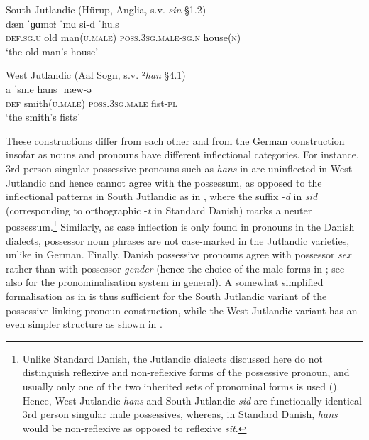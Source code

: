 \documentclass[output=paper]{langsci/langscibook}
\begin{document}
 
\ea\label{ex:hoeder:17}
	\ea\label{ex:hoeder:17a}
	South Jutlandic (Hürup, Anglia, \citealt{JulNielsen.1995} s.v. \textit{sin} \S 1.2)\\
	\gll dæn{} ˈɡɑməɫ ˈmɑ{\hoederN} si-d ˈhu.s\\
     \textsc{def.sg.u} old man(\textsc{u.male}){} \textsc{poss.3sg.male-sg.n} house(\textsc{n})\\
	\glt `the{} old man’s house'

	\ex\label{ex:hoeder:17b}
	West Jutlandic (Aal Sogn, \citealt{Rasmussen.1965} s.v. ²\textit{han} \S4.1)\\
	\gll a ˈsme hans ˈnæw-ə\\
     \textsc{def} smith(\textsc{u.male}){} \textsc{poss.3sg.male} fist-\textsc{pl}\\
	\glt `the smith’s fists'
\z
\z

These constructions differ from each other and from the German construction insofar as nouns and pronouns have different inflectional categories. For instance, 3rd person singular possessive pronouns such as \textit{hans} in  are uninflected in West Jutlandic and hence cannot agree with the possessum, as opposed to the inflectional patterns in South Jutlandic as in , where the suffix -\textit{d} in \textit{sid} (corresponding to orthographic -\textit{t} in Standard Danish) marks a neuter possessum.\footnote{Unlike Standard Danish, the Jutlandic dialects discussed here do not distinguish reflexive and non-reflexive forms of the possessive pronoun, and usually only one of the two inherited sets of pronominal forms is used (\citealt{JulNielsen.1986}). Hence, West Jutlandic \textit{hans} and South Jutlandic \textit{sid} are functionally identical 3rd person singular male possessives, whereas, in Standard Danish, \textit{hans} would be non-reflexive as opposed to reflexive \textit{sit}.} Similarly, as case inflection is only found in pronouns in the Danish dialects, possessor noun phrases are not case-marked in the Jutlandic varieties, unlike in German. Finally, Danish possessive pronouns agree with possessor \textit{sex} rather than with possessor \textit{gender} (hence the choice of the male forms in ; see also  for the pronominalisation system in general). A somewhat simplified formalisation as in  is thus sufficient for the South Jutlandic variant of the possessive linking pronoun construction, while the West Jutlandic variant has an even simpler structure as shown in .
\end{document}
